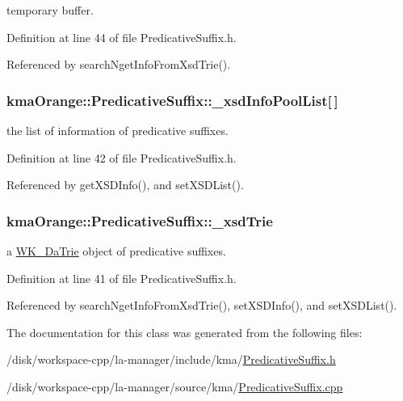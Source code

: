 temporary buffer. 



Definition at line 44 of file PredicativeSuffix.h.

Referenced by searchNgetInfoFromXsdTrie().\hypertarget{classkmaOrange_1_1PredicativeSuffix_cd1fbf180be11ec4e223f352bc173316}{
\subsubsection[{\_\-xsdInfoPoolList}]{ {\bf kmaOrange::PredicativeSuffix::\_\-xsdInfoPoolList}\mbox{[}$\,$\mbox{]}}}
\label{classkmaOrange_1_1PredicativeSuffix_cd1fbf180be11ec4e223f352bc173316}


the list of information of predicative suffixes. 



Definition at line 42 of file PredicativeSuffix.h.

Referenced by getXSDInfo(), and setXSDList().\hypertarget{classkmaOrange_1_1PredicativeSuffix_93d8262550760d5f74133e7a4f4a5b54}{
\subsubsection[{\_\-xsdTrie}]{ {\bf kmaOrange::PredicativeSuffix::\_\-xsdTrie}}}
\label{classkmaOrange_1_1PredicativeSuffix_93d8262550760d5f74133e7a4f4a5b54}


a \hyperlink{classkmaOrange_1_1WK__DaTrie}{WK\_\-DaTrie} object of predicative suffixes. 



Definition at line 41 of file PredicativeSuffix.h.

Referenced by searchNgetInfoFromXsdTrie(), setXSDInfo(), and setXSDList().

The documentation for this class was generated from the following files:\begin{CompactItemize}
\item 
/disk/workspace-cpp/la-manager/include/kma/\hyperlink{PredicativeSuffix_8h}{PredicativeSuffix.h}\item 
/disk/workspace-cpp/la-manager/source/kma/\hyperlink{PredicativeSuffix_8cpp}{PredicativeSuffix.cpp}\end{CompactItemize}
